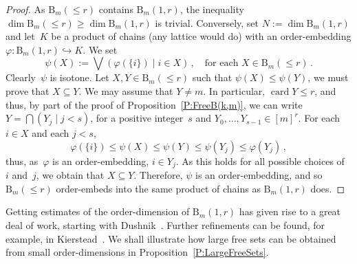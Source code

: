 \documentclass[psamsfonts,reqno]{amsart}
\theoremstyle{plain}
\theoremstyle{definition}
\theoremstyle{remark}
\numberwithin{equation}{section}
\numberwithin{figure}{section}
\newcommand{\gf}{\varphi}
\newcommand{\gy}{\psi}
\newcommand{\les}{\leqslant}
\DeclareMathOperator{\card}{card}
\newcommand{\into}{\hookrightarrow}
\newcommand{\famm}[2]{\left(#1\mid#2\right)}
\newcommand{\set}[1]{\{#1\}}
\newcommand{\rB}{\mathrm{B}}
\begin{document}
\begin{proof}
As $\rB_m({\les}r)$ contains $\rB_m(1,r)$, the inequality $\dim\rB_m({\les}r)\geq\dim\rB_m(1,r)$ is trivial. Conversely, set $N:=\dim\rB_m(1,r)$ and let~$K$ be a product of chains (any lattice would do) with an order-embedding $\gf\colon\rB_m(1,r)\into K$. We set
 \[
 \gy(X):=\bigvee\famm{\gf(\set{i})}{i\in X}\,,
 \quad\text{for each }X\in\rB_m({\les}r)\,.
 \]
Clearly~$\gy$ is isotone. Let $X,Y\in\rB_m({\les}r)$ such that $\gy(X)\les\gy(Y)$, we must prove that $X\subseteq Y$. We may assume that $Y\neq m$. In particular, $\card Y\leq r$, and thus, by part of the proof of Proposition~\ref{P:FreeB(k,m)}, we can write $Y=\bigcap\famm{Y_j}{j<s}$, for a positive integer~$s$ and $Y_0,\dots,Y_{s-1}\in[m]^r$. For each $i\in X$ and each $j<s$,
 \[
 \gf(\set{i})\leq\gy(X)\leq\gy(Y)\leq\gy(Y_j)\leq\gf(Y_j)\,,
 \]
thus, as~$\gf$ is an order-embedding, $i\in Y_j$. As this holds for all possible choices of~$i$ and~$j$, we obtain that $X\subseteq Y$. Therefore, $\gy$ is an order-embedding, and so $\rB_m({\les}r)$ order-embeds into the same product of chains as $\rB_m(1,r)$ does.
\end{proof}

Getting estimates of the order-dimension of $\rB_m(1,r)$ has given rise to a great deal of work, starting with Dushnik~\cite{Dush50}. Further refinements can be found, for example, in Kierstead~\cite{Kier96,Kier99}. We shall illustrate how large free sets can be obtained from small order-dimensions in Proposition~\ref{P:LargeFreeSets}.
\end{document}
